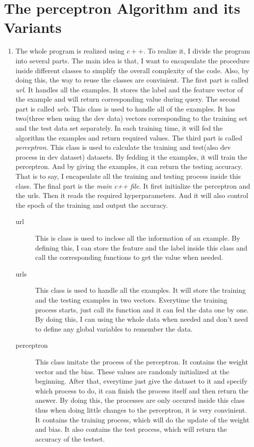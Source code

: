 \documentclass{article}
\begin{document}
	\section{The perceptron Algorithm and its Variants}
	\begin{enumerate}
		\item The whole program is realized using \emph{$c++$}. To realize it, I divide the program into several parts. The main idea is that, I want to encapsulate the procedure inside different classes to simplify the overall complexity of the code. Also, by doing this, the way to reuse the classes are convinient. The first part is called \emph{url}. It handles all the examples. It stores the label and the feature vector of the example and will return corresponding value during query. The second part is called \emph{urls}. This class is used to handle all of the examples. It has two(three when using the dev data) vectors corresponding to the training set and the test data set separately. In each training time, it will fed the algorithm the examples and return required values. The third part is called \emph{perceptron}. This class is used to calculate the training and test(also dev process in dev dataset) datasets. By fedding it the examples, it will train the perceptron. And by giving the examples, it can return the testing accuracy. That is to say, I encapsulate all the training and testing process inside this class. The final part is the \emph{main c++ file}. It first initialize the perceptron and the urls. Then it reads the required hyperparameters. And it will also control the epoch of the training and output the accuracy. 
		\begin{description}
			\item[url]
				This is class is used to inclose all the information of an example. By defining this, I can store the feature and the label inside this class and call the corresponding functions to get the value when needed.
			\item[urls]
				This class is used to handle all the examples. It will store the training and the testing examples in two vectors. Everytime the training process starts, just call its function and it can fed the data one by one. By doing this, I can using the whole data when needed and don't need to define any global variables to remember the data.
			\item[perceptron]
				This class imitate the process of the perceptron. It contains the weight vector and the bias. These values are randomly initialized at the beginning. After that, everytime just give the dataset to it and specify which process to do, it can finish the process itself and then return the answer. By doing this, the processes are only occured inside this class thus when doing little changes to the perceptron, it is very convinient. It contains the training process, which will do the update of the weight and bias. It also contains the test process, which will return the accuracy of the testset.

\end{description}
\end{enumerate}
\end{document}
